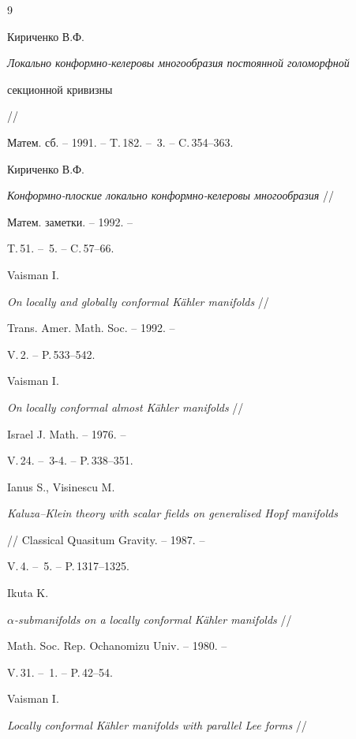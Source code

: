 \begin{thebibliography}{9}







Кириченко В.Ф.


{\em Локально конформно-келеровы многообразия постоянной голоморфной 


секционной кривизны} //


Матем. сб. -- 1991. -- T.\,182. -- \No\,3. -- C.\,354--363.




Кириченко В.Ф.


{\em Конформно-плоские локально конформно-келеровы многообразия} //


Матем. заметки. -- 1992. -- 


T.\,51. -- \No\,5. -- C.\,57--66.




Vaisman I.


{\em On locally and globally conformal K\"ahler manifolds} //


Trans. Amer. Math. Soc. -- 1992. --


V.\,2. -- P.\,533--542.




Vaisman I.


{\em On locally conformal almost K\"ahler manifolds} //


Israel J. Math. -- 1976. -- 


V.\,24. -- \No\,3-4. -- P.\,338--351.




Ianus S., Visinescu M.


{\em Kaluza--Klein theory with scalar fields on generalised Hopf manifolds}


// Classical Quasitum Gravity. -- 1987. --


V.\,4. -- \No\,5. -- P.\,1317--1325.




Ikuta K.


{\em $\alpha$-submanifolds on a locally conformal K\"ahler manifolds} //


Math. Soc. Rep. Ochanomizu Univ. -- 1980. --


V.\,31. -- \No\,1. -- P.\,42--54.




Vaisman I.


{\em Locally conformal K\"ahler manifolds with parallel Lee forms} //



\end{thebibliography}
